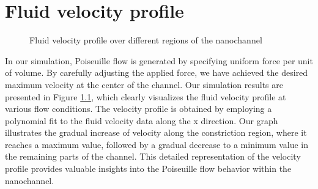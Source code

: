 \chapter{Fluid velocity profile}\label{appendix:B}

\begin{figure}[htbp]
  \centering
  
  \vspace{0.5cm}
  \caption{Fluid velocity profile over different regions of the nanochannel}
  \label{A:2}
\end{figure}

In our simulation, Poiseuille flow is generated by specifying uniform force per unit of volume. By carefully adjusting the applied force, we have achieved the desired maximum velocity at the center of the channel. Our simulation results are presented in Figure \ref{A:2}, which clearly visualizes the fluid velocity profile at various flow conditions. The velocity profile is obtained by employing a polynomial fit to the fluid velocity data along the x direction. Our graph illustrates the gradual increase of velocity along the constriction region, where it reaches a maximum value, followed by a gradual decrease to a minimum value in the remaining parts of the channel. This detailed representation of the velocity profile provides valuable insights into the Poiseuille flow behavior within the nanochannel.
